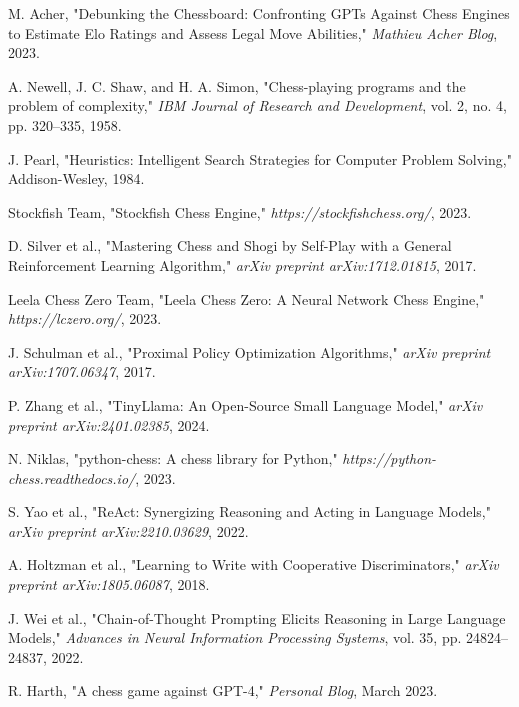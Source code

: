 \documentclass[11pt,a4paper]{report}
\begin{document}
\renewcommand{\bibname}{References}
\begin{thebibliography}{99}
\thispagestyle{fancy}
M. Acher, "Debunking the Chessboard: Confronting GPTs Against Chess Engines to Estimate Elo Ratings and Assess Legal Move Abilities," \textit{Mathieu Acher Blog}, 2023.

A. Newell, J. C. Shaw, and H. A. Simon, "Chess-playing programs and the problem of complexity," \textit{IBM Journal of Research and Development}, vol. 2, no. 4, pp. 320--335, 1958.

J. Pearl, "Heuristics: Intelligent Search Strategies for Computer Problem Solving," Addison-Wesley, 1984.

Stockfish Team, "Stockfish Chess Engine," \textit{https://stockfishchess.org/}, 2023.

D. Silver et al., "Mastering Chess and Shogi by Self-Play with a General Reinforcement Learning Algorithm," \textit{arXiv preprint arXiv:1712.01815}, 2017.

Leela Chess Zero Team, "Leela Chess Zero: A Neural Network Chess Engine," \textit{https://lczero.org/}, 2023.

J. Schulman et al., "Proximal Policy Optimization Algorithms," \textit{arXiv preprint arXiv:1707.06347}, 2017.

P. Zhang et al., "TinyLlama: An Open-Source Small Language Model," \textit{arXiv preprint arXiv:2401.02385}, 2024.

N. Niklas, "python-chess: A chess library for Python," \textit{https://python-chess.readthedocs.io/}, 2023.

S. Yao et al., "ReAct: Synergizing Reasoning and Acting in Language Models," \textit{arXiv preprint arXiv:2210.03629}, 2022.

A. Holtzman et al., "Learning to Write with Cooperative Discriminators," \textit{arXiv preprint arXiv:1805.06087}, 2018.

J. Wei et al., "Chain-of-Thought Prompting Elicits Reasoning in Large Language Models," \textit{Advances in Neural Information Processing Systems}, vol. 35, pp. 24824--24837, 2022.

R. Harth, "A chess game against GPT-4," \textit{Personal Blog}, March 2023.


\end{thebibliography}
\end{document}
